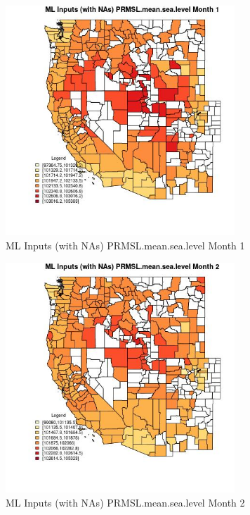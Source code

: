\begin{figure} 
\centering  
\includegraphics[width=0.77\textwidth]{Code_Outputs/Report_ML_input_PM25_Step4_part_e_de_duplicated_aves_compiled_2019-05-21wNAs_CountyPRMSLmeansealevelmedianMonth1.jpg} 
\caption{\label{fig:Report_ML_input_PM25_Step4_part_e_de_duplicated_aves_compiled_2019-05-21wNAsCountyPRMSLmeansealevelmedianMonth1}ML Inputs (with NAs) PRMSL.mean.sea.level Month 1} 
\end{figure} 
 

\begin{figure} 
\centering  
\includegraphics[width=0.77\textwidth]{Code_Outputs/Report_ML_input_PM25_Step4_part_e_de_duplicated_aves_compiled_2019-05-21wNAs_CountyPRMSLmeansealevelmedianMonth2.jpg} 
\caption{\label{fig:Report_ML_input_PM25_Step4_part_e_de_duplicated_aves_compiled_2019-05-21wNAsCountyPRMSLmeansealevelmedianMonth2}ML Inputs (with NAs) PRMSL.mean.sea.level Month 2} 
\end{figure} 
 

